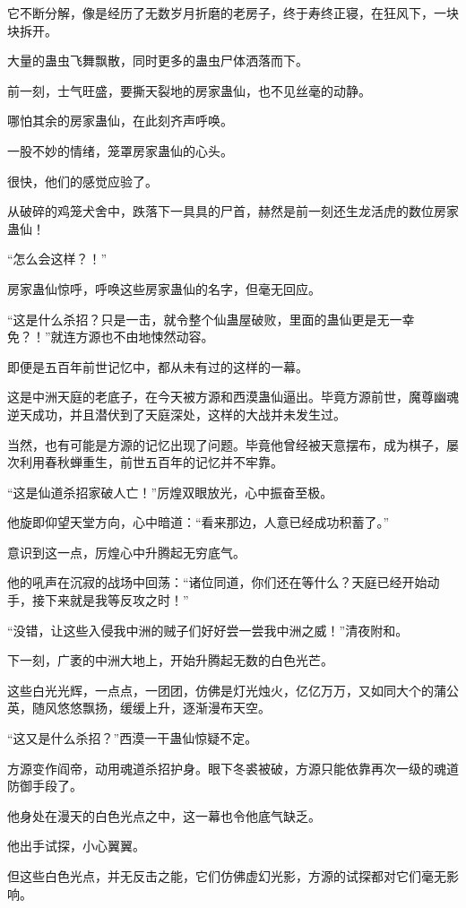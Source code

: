 \begin{this_body}
它不断分解，像是经历了无数岁月折磨的老房子，终于寿终正寝，在狂风下，一块块拆开。

大量的蛊虫飞舞飘散，同时更多的蛊虫尸体洒落而下。

前一刻，士气旺盛，要撕天裂地的房家蛊仙，也不见丝毫的动静。

哪怕其余的房家蛊仙，在此刻齐声呼唤。

一股不妙的情绪，笼罩房家蛊仙的心头。

很快，他们的感觉应验了。

从破碎的鸡笼犬舍中，跌落下一具具的尸首，赫然是前一刻还生龙活虎的数位房家蛊仙！

“怎么会这样？！”

房家蛊仙惊呼，呼唤这些房家蛊仙的名字，但毫无回应。

“这是什么杀招？只是一击，就令整个仙蛊屋破败，里面的蛊仙更是无一幸免？！”就连方源也不由地悚然动容。

即便是五百年前世记忆中，都从未有过的这样的一幕。

这是中洲天庭的老底子，在今天被方源和西漠蛊仙逼出。毕竟方源前世，魔尊幽魂逆天成功，并且潜伏到了天庭深处，这样的大战并未发生过。

当然，也有可能是方源的记忆出现了问题。毕竟他曾经被天意摆布，成为棋子，屡次利用春秋蝉重生，前世五百年的记忆并不牢靠。

“这是仙道杀招家破人亡！”厉煌双眼放光，心中振奋至极。

他旋即仰望天堂方向，心中暗道：“看来那边，人意已经成功积蓄了。”

意识到这一点，厉煌心中升腾起无穷底气。

他的吼声在沉寂的战场中回荡：“诸位同道，你们还在等什么？天庭已经开始动手，接下来就是我等反攻之时！”

“没错，让这些入侵我中洲的贼子们好好尝一尝我中洲之威！”清夜附和。

下一刻，广袤的中洲大地上，开始升腾起无数的白色光芒。

这些白光光辉，一点点，一团团，仿佛是灯光烛火，亿亿万万，又如同大个的蒲公英，随风悠悠飘扬，缓缓上升，逐渐漫布天空。

“这又是什么杀招？”西漠一干蛊仙惊疑不定。

方源变作阎帝，动用魂道杀招护身。眼下冬裘被破，方源只能依靠再次一级的魂道防御手段了。

他身处在漫天的白色光点之中，这一幕也令他底气缺乏。

他出手试探，小心翼翼。

但这些白色光点，并无反击之能，它们仿佛虚幻光影，方源的试探都对它们毫无影响。


\end{this_body}

